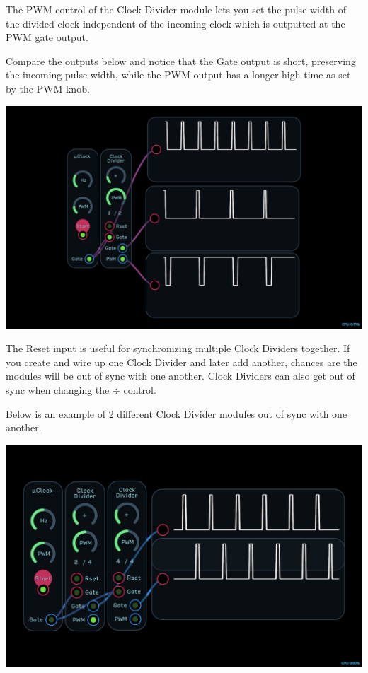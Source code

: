 \documentclass[11pt]{book}
\begin{document}
\begin{multicols*}{2}
The PWM control of the Clock Divider module lets you set the pulse width of the divided clock independent of the incoming clock which is outputted at the PWM gate output.

Compare the outputs below and notice that the Gate output is short, preserving the incoming pulse width, while the PWM output has a longer high time as set by the PWM knob.

\begin{center}
\includegraphics[width=0.95\linewidth]{clock-divider-fig3.png}
\end{center}

The Reset input is useful for synchronizing multiple Clock Dividers together. If you create and wire up one Clock Divider and later add another, chances are the modules will be out of sync with one another. Clock Dividers can also get out of sync when changing the $\div$ control.

Below is an example of 2 different Clock Divider modules out of sync with one another.

\begin{center}
\includegraphics[width=0.95\linewidth]{clock-divider-fig4.png}
\end{center}


\end{multicols*}
\end{document}
